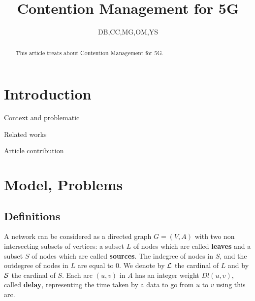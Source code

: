\documentclass[a4paper,10pt]{article}
\title{Contention Management for 5G}
\author{DB,CC,MG,OM,YS}
\begin{document}
\maketitle

\begin{abstract}
This article treats about Contention Management for 5G.
\end{abstract}

\section{Introduction}
  \itemize
    \item Context and problematic
    \item Related works
    \item Article contribution

\section{Model, Problems}

  \subsection{Definitions}
	  A network can be considered as a directed graph $G=(V,A)$ with two non intersecting subsets of vertices: 
	a subset $L$ of nodes which are called {\bf leaves} and a subset $S$ of nodes which are called {\bf sources}.  
      The indegree of nodes in $S$, and the outdegree of nodes in $L$ are equal to 0. 
      We denote by ${\cal L}$ the cardinal of $L$ and by ${\cal S}$ the cardinal of $S$. 
      Each arc  $(u,v)$ in $A$ has an integer weight $Dl(u,v)$, called {\bf delay}, representing the time taken by a data to go from $u$ to $v$
      using this arc.
\end{document}
